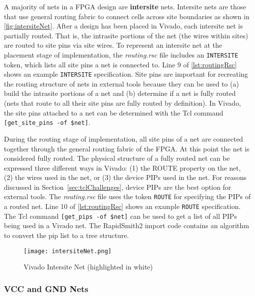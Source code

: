 A majority of nets in a FPGA design are \textbf{intersite} nets. Intersite nets
are those that use general routing fabric to connect cells across site
boundaries as shown in \autoref{fig:intersiteNet}.  After
a design has been placed in Vivado, each intersite net is partially routed.
That is, the intrasite portions of the net (the wires within sites) are routed
to site pins via site wires. To represent an intersite net at the placement
stage of implementation, the \textit{routing.rsc} file includes an
\texttt{INTERSITE} token, which lists all site pins a net is connected to. Line
9 of \autoref{lst:routingRsc} shows an example \texttt{INTERSITE}
specification. Site pins are important for recreating the routing structure of
nets in external tools because they can be used to (a) build the intrasite
portions of a net and (b) determine if a net is fully routed (nets that route
to all their site pins are fully routed by definition). In Vivado, the site pins
attached to a net can be determined with the Tcl command
\texttt{[get\_site\_pins -of \$net]}.

During the routing stage of implementation, all site pins of a net are connected
together through the general routing fabric of the FPGA. At this point the net
is considered fully routed. The physical structure of a fully routed net
can be expressed three different ways in Vivado:  (1) the ROUTE property on the
net, (2) the wires used in the net, or (3) the device PIPs used in the net. For
reasons discussed in Section~\ref{sec:tclChallenges}, device PIPs are the best option
for external tools. The \textit{routing.rsc} file uses the token \texttt{ROUTE}
for specifying the PIPs of a routed net. Line 10 of \autoref{lst:routingRsc}
shows an example \texttt{ROUTE} specification. The Tcl command
\texttt{[get\_pips -of \$net]} can be used to get a list of all PIPs being used
in a Vivado net. The RapidSmith2 import code contains an algorithm to convert
the pip list to a tree structure.

\begin{figure}[t!]
  \centering
  \texttt{[image: intersiteNet.png]}
  \caption{Vivado Intersite Net (highlighted in white)}
  \label{fig:intersiteNet}
\end{figure}

\subsubsection{VCC and GND Nets}

